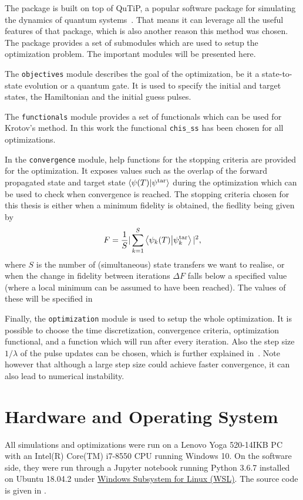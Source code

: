 \documentclass[main.tex]{subfiles}
\begin{document}
The package is built on top of QuTiP, a popular software package for simulating the dynamics of quantum systems~\cite{johansson_qutip_2013}.
That means it can leverage all the useful features of that package, which is also another reason this method was chosen.
The package provides a set of submodules which are used to setup the optimization problem.
The important modules will be presented here.

The \texttt{objectives} module describes the goal of the optimization, be it a state-to-state evolution or a quantum gate.
It is used to specify the initial and target states, the Hamiltonian and the initial guess pulses.

The \texttt{functionals} module provides a set of functionals which can be used for Krotov's method.
In this work the functional \texttt{chis\_ss} has been chosen for all optimizations.

In the \texttt{convergence} module, help functions for the stopping criteria are provided for the optimization.
It exposes values such as the overlap of the forward propagated state and target state \(\braket{\psi(T)}{\psi^{\text{tar}}}\) during the optimization which can be used to check when convergence is reached.
The stopping criteria chosen for this thesis is either when a minimum fidelity is obtained, the fiedlity being given by~\cite{ofek_extending_2016}
\begin{equation}
    F = \frac{1}{S}|\sum_{k=1}^{S} \braket{\psi_k(T)}{\psi_{k}^{\text{tar}}}|^2,
    \label{eq:total-fidelity}
\end{equation}
where \(S\) is the number of (simultaneous) state transfers we want to realise, or when the change in fidelity between iterations \(\Delta F\) falls below a specified value (where a local minimum can be assumed to have been reached).
The values of these will be specified in~

Finally, the \texttt{optimization} module is used to setup the whole optimization.
It is possible to choose the time discretization, convergence criteria, optimization functional, and a function which will run after every iteration.
Also the step size \(1/\lambda\) of the pulse updates can be chosen, which is further explained in~\cite{goerz_krotov:_2019}.
Note however that although a large step size could achieve faster convergence, it can also lead to numerical instability.

\section{Hardware and Operating System}
All simulations and optimizations were run on a Lenovo Yoga 520-14IKB PC with an Intel(R) Core(TM) i7-8550 CPU running Windows 10.
On the software side, they were run through a Jupyter notebook running Python 3.6.7 installed on Ubuntu 18.04.2 under \href{https://docs.microsoft.com/en-us/windows/wsl/faq}{Windows Subsystem for Linux (WSL)}.
The source code is given in .
\end{document}
